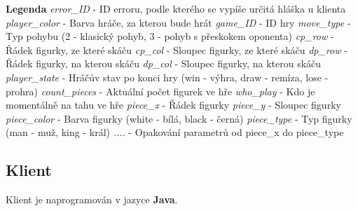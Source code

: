 \documentclass[12pt, a4paper]{article}
\begin{document}
\newpage
\large{\textbf{Legenda}}
\newline\textit{error\_ID} - ID erroru, podle kterého se vypíše určitá hláška u klienta
\newline\textit{player\_color} - Barva hráče, za kterou bude hrát
\newline\textit{game\_ID} -  ID hry
\newline\textit{move\_type} - Typ pohybu (2 - klasický pohyb, 3 - pohyb s přeskokem oponenta)
\newline\textit{cp\_row} - Řádek figurky, ze které skáču
\newline\textit{cp\_col} - Sloupec figurky, ze které skáču
\newline\textit{dp\_row} - Řádek figurky, na kterou skáču
\newline\textit{dp\_col} - Sloupec figurky, na kterou skáču
\newline\textit{player\_state} - Hráčův stav po konci hry (win - výhra, draw - remíza, lose - prohra)
\newline\textit{count\_pieces} - Aktuální počet figurek ve hře
\newline\textit{who\_play} -  Kdo je momentálně na tahu ve hře
\newline\textit{piece\_x} - Řádek figurky 
\newline\textit{piece\_y} - Sloupec figurky
\newline\textit{piece\_color} -  Barva figurky (white - bílá, black - černá)
\newline\textit{piece\_type} - Typ figurky (man - muž, king - král)
\newline\textit{....} - Opakování parametrů od piece\_x do piece\_type
\subsection{Klient}
\label{Klient}
Klient je naprogramován v jazyce \textbf{Java}.
\end{document}
